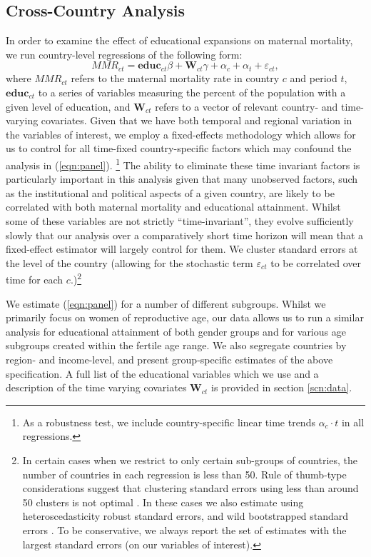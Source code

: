 \documentclass{article}[12pt,subeqn]
\begin{document}
\begin{spacing}{1.4}
\subsection{Cross-Country Analysis}
In order to examine the effect of educational expansions on maternal mortality, 
we run country-level regressions of the following form:
\begin{equation}
\label{eqn:panel}
   MMR_{ct}=\mathbf{educ}_{ct}\beta + \mathbf{W}_{ct}\gamma+\alpha_c+\alpha_t+
   \varepsilon_{ct},
\end{equation}
where $MMR_{ct}$ refers to the maternal mortality rate in country $c$ and period 
$t$, $\mathbf{educ}_{ct}$ to a series of variables measuring the percent of the 
population with a given level of education, and $\mathbf{W}_{ct}$ refers to a 
vector of relevant country- and time-varying covariates.  Given that we have both 
temporal and regional variation in the variables of interest, we employ a 
fixed-effects methodology which allows for us to control for all time-fixed 
country-specific factors which may confound the analysis in (\ref{eqn:panel}).%
\footnote{As a robustness test, we include country-specific linear time trends
$\alpha_c\cdot t$ in all regressions.}
The ability to eliminate these time invariant factors is particularly important 
in this analysis given that many unobserved factors, such as the institutional 
and political aspects of a given country, are likely to be correlated with both 
maternal mortality and educational attainment. Whilst some of these variables are 
not strictly ``time-invariant'', they evolve sufficiently slowly that our analysis 
over a comparatively short time horizon will mean that a fixed-effect estimator 
will largely control for them. We cluster standard errors at the level of the 
country (allowing for the stochastic term $\varepsilon_{ct}$ to be correlated over
time for each $c$.)\footnote{In certain cases when we restrict to only certain
  sub-groups of countries, the number of countries in each regression is less than
  50.  Rule of thumb-type considerations suggest that clustering standard errors
  using less than around 50 clusters is not optimal \citep{AngristPischke2009,
    NicholsSchaffer2007}. In these cases we also estimate using heteroscedasticity
  robust standard errors, and wild bootstrapped standard errors
  \citep{MackinnonWebb2014,CameronMiller2015}. To be conservative, we always
  report the set of estimates with the largest standard errors (on our variables of
  interest).}

We estimate (\ref{eqn:panel}) for a number of different subgroups. Whilst we
primarily focus on women of reproductive age, our data allows us to run a similar
analysis for educational attainment of both gender groups and for various age
subgroups created within the fertile age range. We also segregate countries by
region- and income-level, and present group-specific estimates of the above
specification. A full list of the educational variables which we use and a 
description of the time varying covariates $\textbf{W}_{ct}$ is provided in
section \ref{scn:data}. 


\end{spacing}
\end{document}
